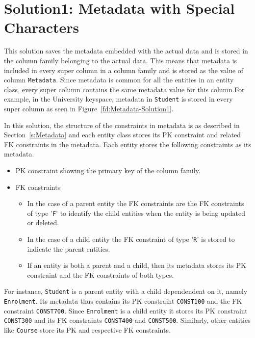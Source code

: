 \section{Solution1:  Metadata with Special Characters} \label{s:design-sol1}

This solution saves the metadata embedded with the actual data and is stored in
the column family belonging to the actual data. This means that metadata is
included in every super column in a column family and is stored as the value of
column \texttt{Metadata}. Since metadata is common for all the entities in an
entity class, every super column contains the same metadata value for this
column.For example, in the University keyspace, metadata in \texttt{Student} is
stored in every super column as seen in Figure~\ref{fd:Metadata-Solution1}.
	

		
In this solution, the structure of the constraints in metadata is as described
in Section~\ref{s:Metadata} and each entity class stores  its \ac{PK} constraint
and related \ac{FK} constraints in the metadata.
Each entity stores the following constraints as its metadata.
	
		\begin{itemize}
		  \item  \ac{PK} constraint showing the primary key of the column family.
		  \item \ac{FK} constraints 
				\begin{itemize}
					\item In the case of a parent entity the \ac{FK} constraints are the \ac{FK}
					constraints of type '\texttt{F}' to identify the child entities when the entity
					is being updated or deleted.
					\item  In the case of a child entity the \ac{FK} constraint of type '\texttt{R}'
					is stored to indicate the parent entities.
					\item If an entity is both a parent and a child, then its metadata
					stores its \ac{PK} constraint and the \ac{FK} constraints of both types.
				\end{itemize}
		\end{itemize}
		

For instance, \texttt{Student}  is a parent entity with a child dependendent on
it, namely \texttt{Enrolment}.
Its metadata thus contains its \ac{PK} constraint \texttt{CONST100} and the
\ac{FK} constraint \texttt{CONST700}. Since \texttt{Enrolment} is a child entity
it  stores its \ac{PK} constraint \texttt{CONST300} and its \ac{FK} constraints
\texttt{CONST400} and \texttt{CONST500}. Similarly, other entities like
\texttt{Course} store its \ac{PK} and respective \ac{FK} constraints.
	
